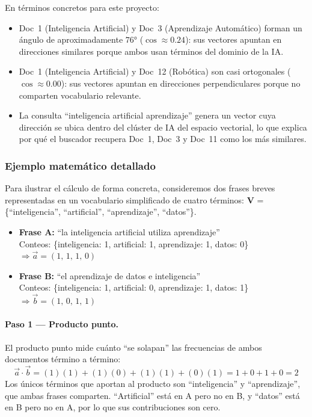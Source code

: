 En términos concretos para este proyecto:
\begin{itemize}
    \item Doc~1 (Inteligencia Artificial) y Doc~3 (Aprendizaje Automático) forman un ángulo de aproximadamente $76°$ ($\cos \approx 0.24$): sus vectores apuntan en direcciones similares porque ambos usan términos del dominio de la IA.
    \item Doc~1 (Inteligencia Artificial) y Doc~12 (Robótica) son casi ortogonales ($\cos \approx 0.00$): sus vectores apuntan en direcciones perpendiculares porque no comparten vocabulario relevante.
    \item La consulta ``inteligencia artificial aprendizaje'' genera un vector cuya dirección se ubica dentro del clúster de IA del espacio vectorial, lo que explica por qué el buscador recupera Doc~1, Doc~3 y Doc~11 como los más similares.
\end{itemize}

\subsubsection{Ejemplo matemático detallado}

Para ilustrar el cálculo de forma concreta, consideremos dos frases breves representadas en un vocabulario simplificado de cuatro términos: \textbf{V} = \{``inteligencia'', ``artificial'', ``aprendizaje'', ``datos''\}.

\begin{itemize}
    \item \textbf{Frase A:} ``la inteligencia artificial utiliza aprendizaje'' \\
    Conteos: \{inteligencia: 1, artificial: 1, aprendizaje: 1, datos: 0\} $\Rightarrow \vec{a} = (1,\, 1,\, 1,\, 0)$
    \item \textbf{Frase B:} ``el aprendizaje de datos e inteligencia'' \\
    Conteos: \{inteligencia: 1, artificial: 0, aprendizaje: 1, datos: 1\} $\Rightarrow \vec{b} = (1,\, 0,\, 1,\, 1)$
\end{itemize}

\paragraph{Paso 1 — Producto punto.}
El producto punto mide cuánto ``se solapan'' las frecuencias de ambos documentos término a término:
\[
\vec{a} \cdot \vec{b} = (1)(1) + (1)(0) + (1)(1) + (0)(1) = 1 + 0 + 1 + 0 = 2
\]
Los únicos términos que aportan al producto son ``inteligencia'' y ``aprendizaje'', que ambas frases comparten. ``Artificial'' está en A pero no en B, y ``datos'' está en B pero no en A, por lo que sus contribuciones son cero.

